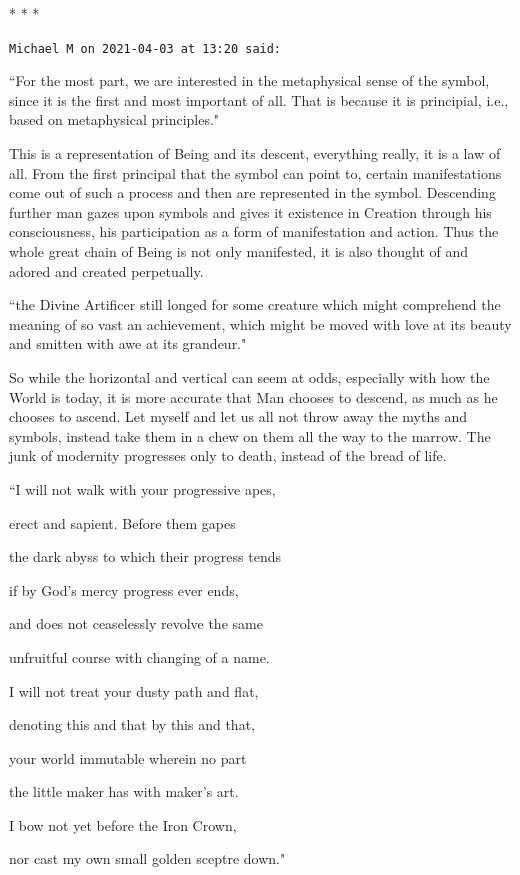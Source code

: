 
\begin{center}* * *\end{center}

\begin{footnotesize}\begin{sffamily}



\texttt{Michael M on 2021-04-03 at 13:20 said: }

``For the most part, we are interested in the metaphysical sense of the symbol, since it is the first and most important of all. That is because it is principial, i.e., based on metaphysical principles."

This is a representation of Being and its descent, everything really, it is a law of all. From the first principal that the symbol can point to, certain manifestations come out of such a process and then are represented in the symbol. Descending further man gazes upon symbols and gives it existence in Creation through his consciousness, his participation as a form of manifestation and action. Thus the whole great chain of Being is not only manifested, it is also thought of and adored and created perpetually.

``the Divine Artificer still longed for some creature which might comprehend the meaning of so vast an achievement, which might be moved with love at its beauty and smitten with awe at its grandeur."

So while the horizontal and vertical can seem at odds, especially with how the World is today, it is more accurate that Man chooses to descend, as much as he chooses to ascend. Let myself and let us all not throw away the myths and symbols, instead take them in a chew on them all the way to the marrow. The junk of modernity progresses only to death, instead of the bread of life.

``I will not walk with your progressive apes,

erect and sapient. Before them gapes

the dark abyss to which their progress tends

if by God's mercy progress ever ends,

and does not ceaselessly revolve the same

unfruitful course with changing of a name.

I will not treat your dusty path and flat,

denoting this and that by this and that,

your world immutable wherein no part

the little maker has with maker's art.

I bow not yet before the Iron Crown,

nor cast my own small golden sceptre down."


\end{sffamily}\end{footnotesize}
